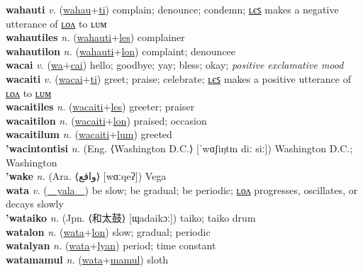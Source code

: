 \textbf{wahauti} \textit{v.} (\hyperref[wahau]{wahau}+\hyperref[ti]{ti})
complain; denounce; condemn; \hyperref[wahautiles]{ʟєꜱ} makes a negative utterance of \hyperref[wahautilon]{ʟᴏᴧ} to ʟᴜᴍ \label{wahauti} \\
\textbf{wahautiles} \textit{n.} (\hyperref[wahauti]{wahauti}+\hyperref[les]{les})
complainer \label{wahautiles} \\
\textbf{wahautilon} \textit{n.} (\hyperref[wahauti]{wahauti}+\hyperref[lon]{lon})
complaint; denouncee \label{wahautilon} \\
\textbf{wacai} \textit{v.} (\hyperref[wa]{wa}+\hyperref[cai]{cai})
hello; goodbye; yay; bless; okay; \textit{positive exclamative mood} \label{wacai} \\
\textbf{wacaiti} \textit{v.} (\hyperref[wacai]{wacai}+\hyperref[ti]{ti})
greet; praise; celebrate; \hyperref[wacaitiles]{ʟєꜱ} makes a positive utterance of \hyperref[wacaitilon]{ʟᴏᴧ} to \hyperref[wacaitilum]{ʟᴜᴍ} \label{wacaiti} \\
\textbf{wacaitiles} \textit{n.} (\hyperref[wacaiti]{wacaiti}+\hyperref[les]{les})
greeter; praiser \label{wacaitiles} \\
\textbf{wacaitilon} \textit{n.} (\hyperref[wacaiti]{wacaiti}+\hyperref[lon]{lon})
praised; occasion \label{wacaitilon} \\
\textbf{wacaitilum} \textit{n.} (\hyperref[wacaiti]{wacaiti}+\hyperref[lum]{lum})
greeted \label{wacaitilum} \\
\textbf{'wacintontisi} \textit{n.} (Eng. ⟨Washington D.C.⟩ [ˈwɑʃiŋtɪn diː siː])
Washington D.C.; Washington \label{'wacintontisi} \\
\textbf{'wake} \textit{n.} (Ara. ⟨واقع‎⟩ [wɑːqeʔ])
Vega \label{'wake} \\
\textbf{wata} \textit{v.} (\hyperref[yala]{~~yala~~})
be slow; be gradual; be periodic; \hyperref[watalon]{ʟᴏᴧ} progresses, oscillates, or decays slowly \label{wata} \\
\textbf{'wataiko} \textit{n.} (Jpn. ⟨和太鼓⟩ [ɰadaikɔː])
taiko; taiko drum \label{'wataiko} \\
\textbf{watalon} \textit{n.} (\hyperref[wata]{wata}+\hyperref[lon]{lon})
slow; gradual; periodic \label{watalon} \\
\textbf{watalyan} \textit{n.} (\hyperref[wata]{wata}+\hyperref[lyan]{lyan})
period; time constant \label{watalyan} \\
\textbf{watamamul} \textit{n.} (\hyperref[wata]{wata}+\hyperref[mamul]{mamul})
sloth \label{watamamul} \\
